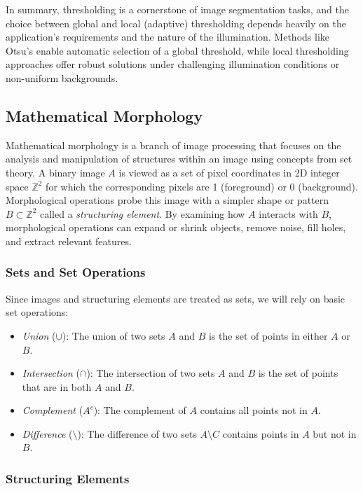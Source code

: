 \documentclass[a4paper,12pt]{article}
\begin{document}
In summary, thresholding is a cornerstone of image segmentation tasks, and the choice between global and local (adaptive) thresholding depends heavily on the application’s requirements and the nature of the illumination. Methods like Otsu's enable automatic selection of a global threshold, while local thresholding approaches offer robust solutions under challenging illumination conditions or non-uniform backgrounds.

\subsection{Mathematical Morphology}

Mathematical morphology is a branch of image processing that focuses on the analysis and manipulation of structures within an image using concepts from set theory. A binary image \(A\) is viewed as a set of pixel coordinates in 2D integer space \(\mathbb{Z}^2\) for which the corresponding pixels are 1 (foreground) or 0 (background). Morphological operations probe this image with a simpler shape or pattern \(B \subset \mathbb{Z}^2\) called a \emph{structuring element}. By examining how \(A\) interacts with \(B\), morphological operations can expand or shrink objects, remove noise, fill holes, and extract relevant features.

\subsubsection{Sets and Set Operations}

Since images and structuring elements are treated as sets, we will rely on basic set operations:
\begin{itemize}
    \item \emph{Union} (\(\cup\)): The union of two sets \(A\) and \(B\) is the set of points in either \(A\) or \(B\).
    \item \emph{Intersection} (\(\cap\)): The intersection of two sets \(A\) and \(B\) is the set of points that are in both \(A\) and \(B\).
    \item \emph{Complement} (\(A^c\)): The complement of \(A\) contains all points not in \(A\).
    \item \emph{Difference} (\(\setminus\)): The difference of two sets \(A \setminus C\) contains points in \(A\) but not in \(B\).
\end{itemize}

\subsubsection{Structuring Elements}
\end{document}
